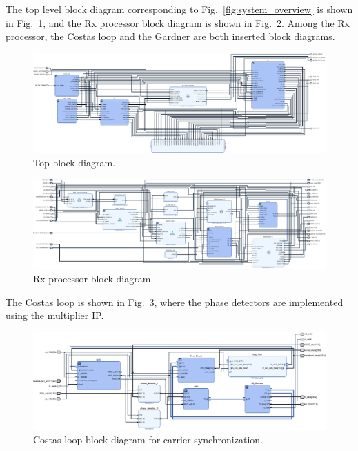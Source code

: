 \documentclass[journal,twoside]{IEEEtran}
\begin{document}
    The top level block diagram corresponding to Fig.~\ref{fig:system_overview} is shown in Fig.~\ref{fig:block_top},
    and the Rx processor block diagram is shown in Fig.~\ref{fig:block_rx}.
    Among the Rx processor, the Costas loop and the Gardner are both inserted block diagrams.
    \begin{figure}
      \includegraphics[width=\linewidth]{../schematic/top.pdf}
      \caption{Top block diagram.}
      \label{fig:block_top}
    \end{figure}
    \begin{figure}
      \includegraphics[width=\linewidth]{../schematic/Rx.pdf}
      \caption{Rx processor block diagram.}
      \label{fig:block_rx}
    \end{figure}

    The Costas loop is shown in Fig.~\ref{fig:block_costas_looop},
    where the phase detectors are implemented using the multiplier IP.

    \begin{figure}
      \includegraphics[width=\linewidth]{../schematic/costas_loop.pdf}
      \caption{Costas loop block diagram for carrier synchronization.}
      \label{fig:block_costas_looop}
    \end{figure}
\end{document}
